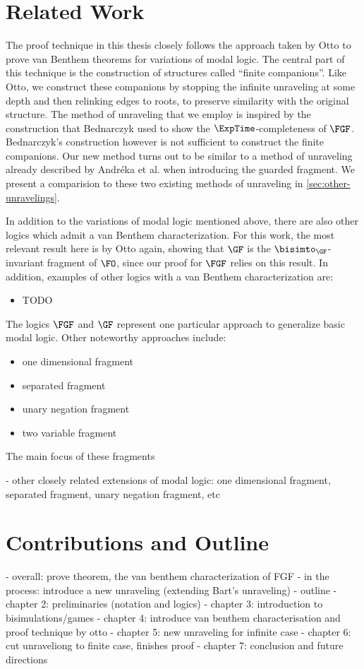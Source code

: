 \section{Related Work}

The proof technique in this thesis closely follows the approach taken by Otto to prove van Benthem theorems for variations of modal logic\cite{Otto04, otto2004a}.
The central part of this technique is the construction of structures called ``finite companions''.
Like Otto, we construct these companions by stopping the infinite unraveling at some depth and then relinking edges to roots, to preserve similarity with the original structure.
The method of unraveling that we employ is inspired by the construction that Bednarczyk used to show the $\ExpTime$-completeness of $\FGF$\cite{Bednarczyk21}.
Bednarczyk's construction however is not sufficient to construct the finite companions.
Our new method turns out to be similar to a method of unraveling already described by Andréka et al. when introducing the guarded fragment\cite{AndrekaNB98}.
We present a comparision to these two existing methods of unraveling in \cref{sec:other-unravelings}.

In addition to the variations of modal logic mentioned above, there are also other logics which admit a van Benthem characterization.
For this work, the most relevant result here is by Otto again, showing that $\GF$ is the $\bisimto_{\GF}$-invariant fragment of $\FO$\cite{Otto2012}, since our proof for $\FGF$ relies on this result.
In addition, examples of other logics with a van Benthem characterization are:
\begin{itemize}
  \item TODO
\end{itemize}

The logics $\FGF$ and $\GF$ represent one particular approach to generalize basic modal logic.
Other noteworthy approaches include:
\begin{itemize}
  \item one dimensional fragment
  \item separated fragment
  \item unary negation fragment
  \item two variable fragment

\end{itemize}
The main focus of these fragments


- other closely related extensions of modal logic: one dimensional fragment, separated fragment, unary negation fragment, etc

\section{Contributions and Outline}

- overall: prove theorem, the van benthem characterization of FGF
- in the process: introduce a new unraveling (extending Bart's unraveling)
- outline
  - chapter 2: preliminaries (notation and logics)
  - chapter 3: introduction to bisimulations/games
  - chapter 4: introduce van benthem characterisation and proof technique by otto
  - chapter 5: new unraveling for infinite case
  - chapter 6: cut unraveliong to finite case, finishes proof
  - chapter 7: conclusion and future directions

